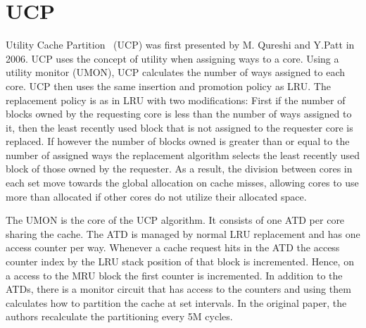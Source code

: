 \section{UCP}
\label{sec:background:algorithms:ucp}

Utility Cache Partition~\cite{Qureshi2006} (UCP) was first presented by M. Qureshi and Y.Patt in 2006. 
UCP uses the concept of utility when assigning ways to a core.
Using a utility monitor (UMON), UCP calculates the number of ways assigned to each core.
UCP then uses the same insertion and promotion policy as LRU.
The replacement policy is as in LRU with two modifications:
First if the number of blocks owned by the requesting core is less than the number of ways assigned to it, then the least recently used block that is not assigned to the requester core is replaced.
If however the number of blocks owned is greater than or equal to the number of assigned ways the replacement algorithm selects the  least recently used block of those owned by the requester.
As a result, the division between cores in each set move towards the global allocation on cache misses, allowing cores to use more than allocated if other cores do not utilize their allocated space.

The UMON is the core of the UCP algorithm.
It consists of one ATD per core sharing the cache. 
The ATD is managed by normal LRU replacement and has one access counter per way.
Whenever a cache request hits in the ATD the access counter index by the LRU stack position of that block is incremented.
Hence, on a access to the MRU block the first counter is incremented.
In addition to the ATDs, there is a monitor circuit that has access to the counters and using them calculates how to partition the cache at set intervals. 
In the original paper, the authors recalculate the partitioning every 5M cycles.

